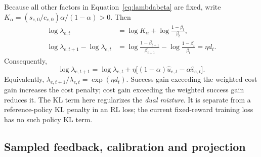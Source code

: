 \documentclass[11pt]{article}
\begin{document}
Because all other factors in Equation~\eqref{eq:lambdabeta} are fixed,
write $K_\alpha=(s_{e,0}/c_{e,0})\alpha/(1-\alpha)>0$. Then
\begin{align}
 \log\lambda_{e,t}&=\log K_\alpha+\log\frac{1-\beta_t}{\beta_t},\\
 \log\lambda_{e,t+1}-\log\lambda_{e,t}
 &=\log\frac{1-\beta_{t+1}}{\beta_{t+1}}
      -\log\frac{1-\beta_t}{\beta_t}=\eta d_t.
\end{align}
Consequently,
\begin{equation}
 \boxed{\log\lambda_{e,t+1}=\log\lambda_{e,t}
   +\eta\bigl[(1-\alpha)\widehat u_{e,t}-\alpha\widehat v_{e,t}\bigr].}
 \label{eq:controller}
\end{equation}
Equivalently, $\lambda_{e,t+1}/\lambda_{e,t}=\exp(\eta d_t)$. Success gain exceeding the weighted cost gain increases the cost penalty; cost gain exceeding the weighted success gain reduces it. The KL term here regularizes the \emph{dual mixture}. It is separate from a reference-policy KL penalty in an RL loss; the current fixed-reward training loss has no such policy KL term.

\subsection{Sampled feedback, calibration and projection}
\end{document}
